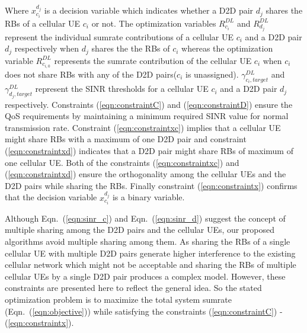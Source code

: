 \documentclass[times]{dacauth}
\begin{document}
\noindent
Where $x_{c_i}^{d_j}$ is a decision variable which indicates whether a D2D pair $d_j$  shares the RBs of a cellular UE $c_i$ or not. The optimization variables  $R_{c_i}^{DL}$ and $R_{d_j}^{DL}$ represent the individual sumrate contributions of a cellular UE $c_i$ and a D2D pair $d_j$ respectively when $d_j$ shares the the RBs of $c_i$ whereas the optimization variable $R_{c_{i,0}}^{DL}$ represents the sumrate contribution of the cellular UE $c_i$  when $c_i$ does not share RBs with any of the D2D pairs($c_i$ is unassigned). $\gamma_{c_i,target}^{DL}$ and $\gamma_{d_j,target}^{DL}$ represent the SINR thresholds for a cellular UE $c_i$ and a D2D pair $d_j$ respectively. Constraints (\ref{eqn:constraintC}) and (\ref{eqn:constraintD}) ensure the QoS requirements by maintaining a minimum required SINR value for normal transmission rate. Constraint (\ref{eqn:constraintxc}) implies that a cellular UE might share RBs with a maximum of one D2D pair and constraint (\ref{eqn:constraintxd}) indicates that a D2D pair might share RBs of maximum of one cellular UE. Both of the constraints (\ref{eqn:constraintxc}) and (\ref{eqn:constraintxd}) ensure the orthogonality among the cellular UEs and the D2D pairs while sharing the RBs. Finally constraint (\ref{eqn:constraintx}) confirms that the decision variable $x_{c_i}^{d_j}$ is a binary variable.

\smallskip
\noindent
Although Eqn.~(\ref{eqn:sinr_c}) and Eqn.~(\ref{eqn:sinr_d}) suggest the concept of multiple sharing among the D2D pairs and the cellular UEs, our proposed algorithms avoid multiple sharing among them. As sharing the RBs of a single cellular UE with multiple D2D pairs generate higher interference to the existing cellular network which might not be acceptable and sharing the RBs of multiple cellular UEs by a single D2D pair produces a complex model. However, these constraints are presented here to reflect the general idea. So the stated optimization problem is to maximize the total system sumrate (Eqn.~(\ref{eqn:objective})) while satisfying the constraints (\ref{eqn:constraintC}) - (\ref{eqn:constraintx}).  
\end{document}
